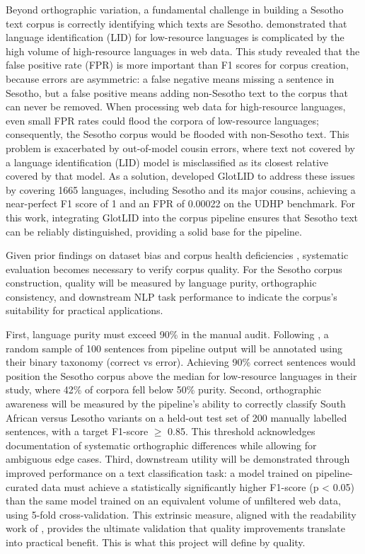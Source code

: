 \documentclass[11pt,a4paper]{article}
\begin{document}
Beyond orthographic variation, a fundamental challenge in building a Sesotho text corpus is correctly identifying which texts are Sesotho. \citet{kargaran2023glotlid} demonstrated that language identification (LID) for low-resource languages is complicated by the high volume of high-resource languages in web data. This study revealed that the false positive rate (FPR) is more important than F1 scores for corpus creation, because errors are asymmetric: a false negative means missing a sentence in Sesotho, but a false positive means adding non-Sesotho text to the corpus that can never be removed. When processing web data for high-resource languages, even small FPR rates could flood the corpora of low-resource languages; consequently, the Sesotho corpus would be flooded with non-Sesotho text. This problem is exacerbated by out-of-model cousin errors, where text not covered by a language identification (LID) model is misclassified as its closest relative covered by that model. As a solution, \citet{kargaran2023glotlid} developed GlotLID to address these issues by covering 1665 languages, including Sesotho and its major cousins, achieving a near-perfect F1 score of 1 and an FPR of 0.00022 on the UDHP benchmark. For this work, integrating GlotLID into the corpus pipeline ensures that Sesotho text can be reliably distinguished, providing a solid base for the pipeline.


\vspace{2em}
Given prior findings on dataset bias and corpus health deficiencies \citep{Mishra2020,Adebara2022}, systematic evaluation becomes necessary to verify corpus quality. For the Sesotho corpus construction, quality will be measured by language purity, orthographic consistency, and downstream NLP task performance to indicate the corpus's suitability for practical applications.
\vspace{2em}

First, language purity must exceed 90\% in the manual audit. Following \citet{kreutzer-etal-2022-quality}, a random sample of 100 sentences from pipeline output will be annotated using their binary taxonomy (correct vs error). Achieving 90\% correct sentences would position the Sesotho corpus above the median for low-resource languages in their study, where 42\% of corpora fell below 50\% purity. Second, orthographic awareness will be measured by the pipeline's ability to correctly classify South African versus Lesotho variants on a held-out test set of 200 manually labelled sentences, with a target F1-score $\geq$ 0.85. This threshold acknowledges \citet{Makutoane2022} documentation of systematic orthographic differences while allowing for ambiguous edge cases. Third, downstream utility will be demonstrated through improved performance on a text classification task: a model trained on pipeline-curated data must achieve a statistically significantly higher F1-score (p < 0.05) than the same model trained on an equivalent volume of unfiltered web data, using 5-fold cross-validation. This extrinsic measure, aligned with the readability work of \citep{Sibeko2024}, provides the ultimate validation that quality improvements translate into practical benefit. This is what this project will define by quality.
\end{document}
